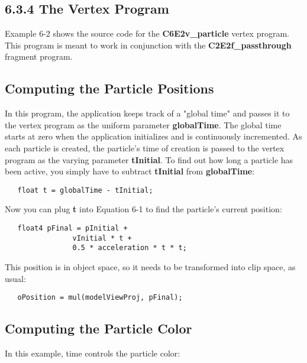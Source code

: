 \documentclass[../main.tex]{subfiles}
\begin{document}
\subsection{6.3.4 The Vertex Program}

Example 6-2 shows the source code for the \textbf{C6E2v_particle} vertex program. This program is meant to work in conjunction with the \textbf{C2E2f_passthrough} fragment program.

\subsection*{Computing the Particle Positions}

In this program, the application keeps track of a "global time" and passes it to the vertex program as the uniform parameter \textbf{globalTime}. The global time starts at zero when the application initializes and is continuously incremented. As each particle is created, the particle's time of creation is passed to the vertex program as the varying parameter \textbf{tInitial}. To find out how long a particle has been active, you simply have to subtract \textbf{tInitial} from \textbf{globalTime}:

\FloatBarrier
\begin{lstlisting}
   float t = globalTime - tInitial;
\end{lstlisting}
\FloatBarrier

Now you can plug \textbf{t} into Equation 6-1 to find the particle's current position:

\FloatBarrier
\begin{lstlisting}
   float4 pFinal = pInitial +
                vInitial * t +
                0.5 * acceleration * t * t;
\end{lstlisting}
\FloatBarrier
                
This position is in object space, so it needs to be transformed into clip space, as usual:

\FloatBarrier
\begin{lstlisting}
   oPosition = mul(modelViewProj, pFinal);
\end{lstlisting}
\FloatBarrier

\subsection*{Computing the Particle Color}

In this example, time controls the particle color:
\end{document}
